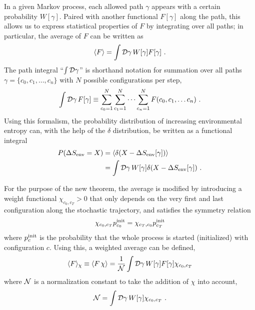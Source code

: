 In a given Markov process, each allowed path \(\gamma\) appears with a certain probability \(W[\gamma]\). Paired with another functional \(F[\gamma]\) along the path, this allows us to express statistical properties of \(F\) by integrating over all paths; in particular, the average of \(F\) can be written as
%
\begin{align}
	\label{eqn:functional average}
	\langle F\rangle = \int \mathcal{D} \gamma\, W[\gamma] F[\gamma] ~.
\end{align}
%
The path integral ``\(\int \mathcal{D}\gamma\)'' is shorthand notation for summation over all paths \(\gamma = \{c_0, c_1, \ldots, c_n\}\) with \(N\) possible configurations per step,
%
\begin{align}
	\int \mathcal{D}\gamma \, F[\gamma]
	\equiv
	\sum_{c_0=1}^N\sum_{c_1=1}^N\cdots\sum_{c_n=1}^N F(c_0, c_1, \ldots c_n) ~.
\end{align}
%
Using this formalism, the probability distribution of increasing environmental entropy can, with the help of the \(\delta\) distribution, be written as a functional integral
%
\begin{equation}
	\begin{split}
	P(\Delta S_\text{env} = X)
	&= \langle \delta(X-\Delta S_\text{env}[\gamma])\rangle \\
	&= \int\mathcal{D}\gamma \, W[\gamma] \delta(X-\Delta S_\text{env}[\gamma])
	~.
	\end{split}
\end{equation}

For the purpose of the new theorem, the average  is modified by introducing a weight functional \(\chi_{c_0,c_T} > 0\) that only depends on the very first and last configuration along the stochastic trajectory, and satisfies the symmetry relation
%
\begin{align}
	\label{eqn:chi symmetry}
	\chi_{c_0,c_T}p_{c_0}^{\text{init}} = \chi_{c_T,c_0}p_{c_T}^{\text{init}}
\end{align}
%
where \(p_c^{\text{init}}\) is the probability that the whole process is started (initialized) with configuration \(c\). Using this, a weighted average can be defined,
%
\begin{align}
	\label{eqn:weighted functional average}
	\langle F\rangle_\chi
	\equiv \langle F \, \chi \rangle
	= \frac1{\mathcal{N}} \int \mathcal{D} \gamma\, W[\gamma] F[\gamma] \chi_{c_0,c_T}
\end{align}
%
where \(\mathcal{N}\) is a normalization constant to take the addition of \(\chi\) into account,
%
\begin{align}
	\label{eqn:weighted normalized}
	\mathcal{N} = \int\mathcal{D}\gamma \, W[\gamma] \chi_{c_0,c_T} ~.
\end{align}


